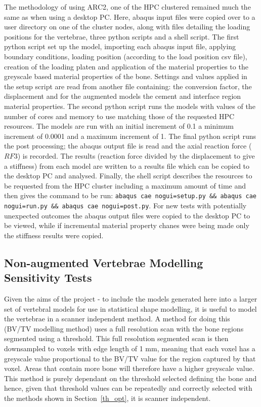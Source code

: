 The methodology of using ARC2, one of the HPC clustered remained much the same
as when using a desktop PC. Here, abaqus input files were copied over to a user
directory on one of the cluster nodes, along with files detailing the loading
positions for the vertebrae, three python scripts and a shell script. The first
python script set up the model, importing each abaqus input file, applying
boundary conditions, loading position (according to the load position csv
file), creation of the  loading platen and application of the material
properties to the greyscale based material properties of the bone. Settings and
values applied in the setup script are read from another file containing: the
conversion factor, the displacement and for the augmented models the cement and
interface region material properties. The second python script runs the models
with values of the number of cores and memory to use matching those of the
requested HPC resources. The models are run with an initial increment of 0.1 a
minimum increment of 0.0001 and a maximum increment of 1. The final python
script runs the post processing; the abaqus output file is read and the axial
reaction force ($RF3$) is recorded. The results (reaction force divided by the
displacement to give a stiffness) from each model are written to a results file
which can be copied to the desktop PC and analysed. Finally, the shell script
describes the resources to be requested from the HPC cluster including a
maximum amount of time and then gives the command to be run: \texttt{abaqus cae
nogui=setup.py \&\& abaqus cae nogui=run.py \&\& abaqus cae nogui=post.py}. For new
tests with potentially unexpected outcomes the abaqus output files were copied
to the desktop PC to be viewed, while if incremental material property chanes
were being made only the stiffness results were copied.


\subsection{Non-augmented Vertebrae Modelling Sensitivity Tests}\label{sec:non_aug_sens}

Given the aims of the project - to include the models generated here into a
larger set of vertebral models for use in statistical shape modelling, it is
useful to model the vertebrae in a scanner independent method. A method for
doing this (BV/TV modelling method) uses a full resolution scan with the bone
regions segmented using a threshold. This full resolution segmented scan is then
downsampled to voxels with edge length of 1 mm, meaning that each voxel has a
greyscale value proportional to the BV/TV value for the region captured by that
voxel. Areas that contain more bone will therefore have a higher greyscale
value. This method is purely dependant on the threshold selected defining the
bone and hence, given that threshold values can be repeatedly and correctly
selected with the methods shown in Section~\ref{th_opt}, it is scanner
independent.

